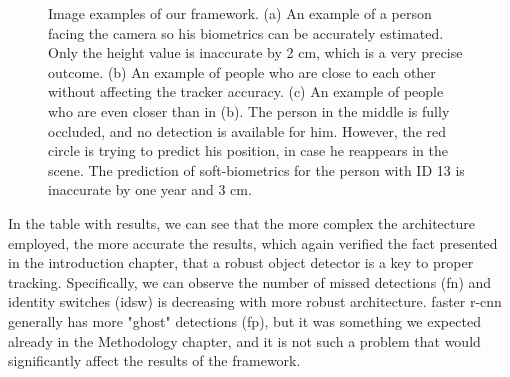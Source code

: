     \begin{figure}[h]
        \centering
        \qquad
        \qquad
        \caption{Image examples of our framework. (a) An example of a person facing the camera so his biometrics can be accurately estimated. Only the height value is inaccurate by 2 cm, which is a very precise outcome. (b) An example of people who are close to each other without affecting the tracker accuracy. (c) An example of people who are even closer than in (b). The person in the middle is fully occluded, and no detection is available for him. However, the red circle is trying to predict his position, in case he reappears in the scene. The prediction of soft-biometrics for the person with ID 13 is inaccurate by one year and 3 cm.}
        \label{fig:examples_of_outputs}
    \end{figure}

    In the table with results, we can see that the more complex the architecture employed, the more accurate the results, which again verified the fact presented in the introduction chapter, that a robust object detector is a key to proper tracking. Specifically, we can observe the number of missed detections (\gls{fn}) and identity switches (\gls{idsw}) is decreasing with more robust architecture. \Gls{faster r-cnn} generally has more "ghost" detections (\gls{fp}), but it was something we expected already in the Methodology chapter, and it is not such a problem that would significantly affect the results of the framework. 
    
